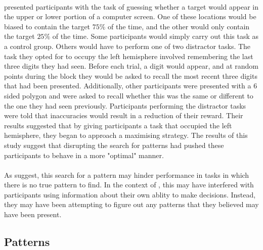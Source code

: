 \documentclass[12pt]{article}
\begin{document}
\paragraph{} \cite{wolford2004searching} presented participants with the task of guessing whether a target would appear in the upper or lower portion of a computer screen. One of these locations would be biased to contain the target $75\%$ of the time, and the other would only contain the target $25\%$ of the time. Some participants would simply carry out this task as a control group. Others would have to perform one of two distractor tasks. The task they opted for to occupy the left hemisphere involved remembering the last three digits they had seen. Before each trial, a digit would appear, and at random points during the block they would be asked to recall the most recent three digits that had been presented. Additionally, other participants were presented with a 6 sided polygon and were asked to recall whether this was the same or different to the one they had seen previously. Participants performing the distractor tasks were told that inaccuracies would result in a reduction of their reward. Their results suggested that by giving participants a task that occupied the left hemisphere, they began to approach a maximising strategy. The results of this study suggest that disrupting the search for patterns had pushed these participants to behave in a more "optimal" manner. 

\paragraph{} As \cite{wolford2004searching} suggest, this search for a pattern may hinder performance in tasks in which there is no true pattern to find. In the context of \cite{clarke2015failure}, this may have interfered with participants using information about their own ablity to make decisions. Instead, they may have been attempting to figure out any patterns that they believed may have been present. %

\subsection*{Patterns}
\end{document}
